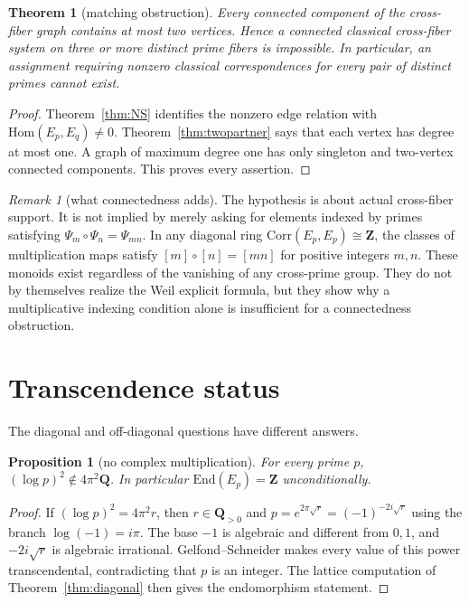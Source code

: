 \documentclass[11pt]{article}
\newtheorem{theorem}{Theorem}
\newtheorem*{proposition}{Proposition}
\theoremstyle{definition}
\theoremstyle{remark}
\newtheorem{remark}{Remark}
\newcommand{\Z}{\mathbf{Z}}
\newcommand{\Q}{\mathbf{Q}}
\newcommand{\Hom}{\mathrm{Hom}}
\newcommand{\End}{\mathrm{End}}
\newcommand{\Corr}{\mathrm{Corr}}
\begin{document}
\begin{theorem}[matching obstruction]\label{thm:nogo}
Every connected component of the cross-fiber graph contains at most two
vertices. Hence a connected classical cross-fiber system on three or more
distinct prime fibers is impossible. In particular, an assignment requiring
nonzero classical correspondences for every pair of distinct primes cannot
exist.
\end{theorem}
\begin{proof}
Theorem~\ref{thm:NS} identifies the nonzero edge relation with
$\Hom(E_p,E_q)\ne0$. Theorem~\ref{thm:twopartner} says that each vertex has
degree at most one. A graph of maximum degree one has only singleton and
two-vertex connected components. This proves every assertion.
\end{proof}

\begin{remark}[what connectedness adds]
The hypothesis is about actual cross-fiber support. It is not implied by
merely asking for elements indexed by primes satisfying
$\Psi_m\circ\Psi_n=\Psi_{mn}$. In any diagonal ring
$\Corr(E_p,E_p)\cong\Z$, the classes of multiplication maps satisfy
$[m]\circ[n]=[mn]$ for positive integers $m,n$. These monoids exist regardless
of the vanishing of any cross-prime group. They do not by themselves realize
the Weil explicit formula, but they show why a multiplicative indexing
condition alone is insufficient for a connectedness obstruction.
\end{remark}

\section{Transcendence status}\label{sec:transcendence}
The diagonal and off-diagonal questions have different answers.
\begin{proposition}[no complex multiplication]
For every prime $p$, $(\log p)^2\notin4\pi^2\Q$. In particular
$\End(E_p)=\Z$ unconditionally.
\end{proposition}
\begin{proof}
If $(\log p)^2=4\pi^2r$, then $r\in\Q_{>0}$ and
$p=e^{2\pi\sqrt r}=(-1)^{-2i\sqrt r}$ using the branch $\log(-1)=i\pi$.
The base $-1$ is algebraic and different from $0,1$, and
$-2i\sqrt r$ is algebraic irrational. Gelfond--Schneider makes every value
of this power transcendental, contradicting that $p$ is an integer.
The lattice computation of Theorem~\ref{thm:diagonal} then gives the
endomorphism statement.
\end{proof}
\end{document}
